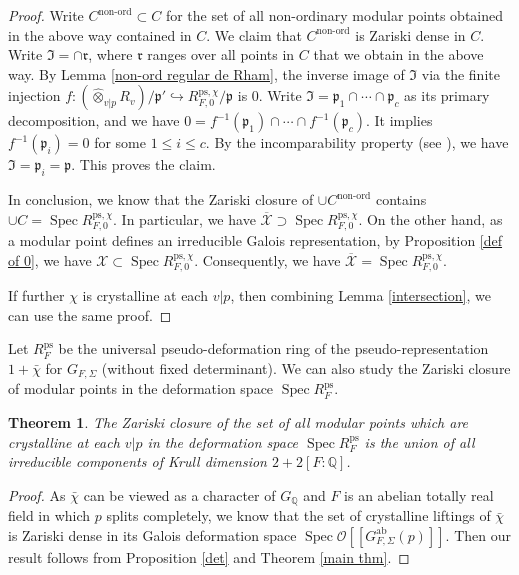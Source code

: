 \documentclass[a4paper, 12pt]{amsart}
\newtheorem{thm}{Theorem}[subsection]
\DeclareMathOperator{\Spec}{Spec}
\def\ps{\mathrm{ps}}
\newcommand{\Q}{\mathbb{Q}}
\newcommand{\cO}{\mathcal{O}}
\newcommand{\kp}{\mathfrak{p}}
\begin{document}
\begin{proof}
    	Write $C^{\operatorname{non-ord}} \subset C$ for the set of all non-ordinary modular points obtained in the above way contained in $C$. We claim that $C^{\operatorname{non-ord}} $ is Zariski dense in $C$. Write $\mathfrak{I}=\cap \mathfrak{r}$, where $\mathfrak{r}$ ranges over all points in $C$ that we obtain in the above way. By Lemma \ref{non-ord regular de Rham}, the inverse image of $\mathfrak{I}$ via the finite injection $f: (\widehat{\otimes}_{v |p} R_{v})/\kp' \hookrightarrow R_{F, 0}^{\ps, \chi}/\kp$ is $0$. Write  $\mathfrak{I}= \kp_1 \cap \cdots \cap \kp_c $ as its primary decomposition, and we have $0= f^{-1} (\kp_1) \cap \cdots \cap f^{-1}(\kp_c)$. It implies $ f^{-1} (\kp_i)=0$ for some $1 \le i \le c$. By the incomparability property (see \cite[Lemma 10.36.20]{stacks-project}), we have $\mathfrak{I}=\kp_i=\kp$. This proves the claim.
    	 
    	 In conclusion, we know that the Zariski closure of $\cup C^{\operatorname{non-ord}}$ contains $\cup C =\Spec R_{F, 0}^{\ps, \chi}$. In particular, we have $\overline{\mathcal{X}} \supset \Spec R_{F, 0}^{\ps, \chi}$. On the other hand, as a modular point defines an irreducible Galois representation, by Proposition \ref{def of 0}, we have $ \mathcal{X} \subset \Spec R_{F, 0}^{\ps, \chi}$. Consequently, we have $\overline{\mathcal{X}} = \Spec R_{F, 0}^{\ps, \chi}$.
    	 
    	 If further $\chi$ is crystalline at each $v|p$, then combining Lemma \ref{intersection}, we can use the same proof.
    \end{proof}
    
    Let $R_F^\ps$ be the universal pseudo-deformation ring of the pseudo-representation $1+\bar{\chi}$ for $G_{F, \Sigma}$ (without fixed determinant). We can also study the Zariski closure of modular points in the deformation space $\Spec R_F^\ps$.
    
    \begin{thm}\label{main thm without det}
    	The Zariski closure of the set of all modular points which are crystalline at each $v|p$ in the deformation space $\Spec R_F^\ps$ is the union of all irreducible components of Krull dimension $2+2[F:\Q]$.
    \end{thm}
    
    \begin{proof}
    	As $\bar{\chi}$ can be viewed as a character of $G_\Q$ and $F$ is an abelian totally real field in which $p$ splits completely, we know that the set of crystalline liftings of $\bar{\chi}$ is Zariski dense in its Galois deformation space $\Spec \cO[[G_{F, \Sigma}^{\operatorname{ab}}(p)]]$. Then our result follows from Proposition \ref{det} and Theorem \ref{main thm}.
    \end{proof}
    
\end{document}
